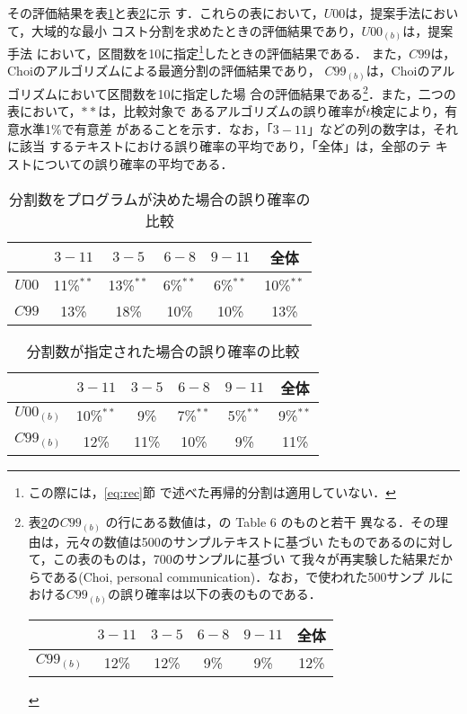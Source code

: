 その評価結果を表\ref{tab:U00vsC99}と表\ref{tab:U00bvsC99b}に示
す．これらの表において，$U00$は，提案手法において，大域的な最小
コスト分割を求めたときの評価結果であり，$U00_{(b)}$は，提案手法
において，区間数を10に指定\footnote{この際には，\ref{eq:rec}節
  で述べた再帰的分割は適用していない．}したときの評価結果である．
また，$C99$は，Choiのアルゴリズムによる最適分割の評価結果であり，
$C99_{(b)}$は，Choiのアルゴリズムにおいて区間数を10に指定した場
合の評価結果である\footnote{表\ref{tab:U00bvsC99b}の$C99_{(b)}$
  の行にある数値は，\cite{choi00:_advan}の Table 6 のものと若干
  異なる．その理由は，元々の数値は500のサンプルテキストに基づい
  たものであるのに対して，この表のものは，700のサンプルに基づい
  て我々が再実験した結果だからである(Choi, personal
  communication)．なお，\cite{choi00:_advan}で使われた500サンプ
  ルにおける$C99_{(b)}$の誤り確率は以下の表のものである．
  
  \begin{tabular}{|c|cccc|c|}\hline
                  & $3-11$      & $3-5$ & $6-8$       & $9-11$     & 全体\\\hline
      $C99_{(b)}$ & 12\%        & 12\%  & 9\%         & 9\%        & 12\%\\\hline
  \end{tabular}
}．また，二つの表において，$**$は，比較対象で
あるアルゴリズムの誤り確率が$t$検定により，有意水準1\%で有意差
があることを示す．なお，「$3-11$」などの列の数字は，それに該当
するテキストにおける誤り確率の平均であり，「全体」は，全部のテ
キストについての誤り確率の平均である．

\begin{table}[htbp]
  \begin{center}
    \caption{分割数をプログラムが決めた場合の誤り確率の比較}
    \begin{tabular}{|c|cccc|c|}\hline
            & $3-11$     & $3-5$       & $6-8$ & $9-11$ & 全体\\\hline
      $U00$ & 11\%$^{**}$ & 13\%$^{**}$ & 6\%$^{**}$  & 6\%$^{**}$   & 10\%$^{**}$\\
      $C99$ & 13\%       & 18\%        & 10\%  & 10\%   & 13\%\\\hline
    \end{tabular}
    \label{tab:U00vsC99}
  \end{center}
\end{table}

\begin{table}[htbp]
  \begin{center}
    \caption{分割数が指定された場合の誤り確率の比較}
    \begin{tabular}{|c|cccc|c|}\hline
                  & $3-11$      & $3-5$ & $6-8$       & $9-11$     & 全体\\\hline
      $U00_{(b)}$ & 10\%$^{**}$ &  9\%  &  7\%$^{**}$ & 5\%$^{**}$ &  9\%$^{**}$\\
      $C99_{(b)}$ & 12\%        & 11\%  & 10\%        & 9\%        & 11\%\\\hline
    \end{tabular}
    \label{tab:U00bvsC99b}
  \end{center}
\end{table}

